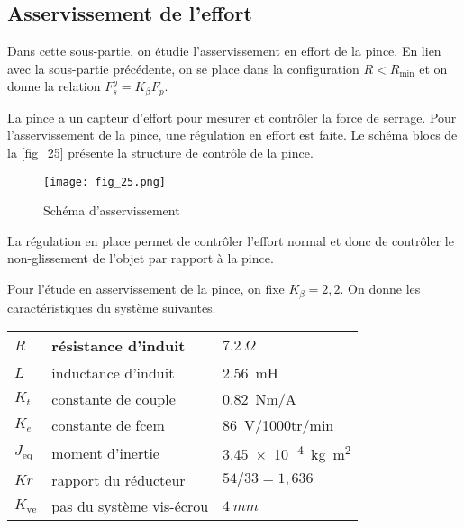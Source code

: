 \subsection{Asservissement de l'effort}

\begin{obj}
Dans cette sous-partie, on étudie l’asservissement en effort de la pince. En lien avec la
sous-partie précédente, on se place dans la configuration $R < R_{\text{min}}$ et on donne la relation
$F_s^y = K_{\beta} F_p$.
\end{obj}

\ifprof
\else
La pince a un capteur d'effort pour mesurer et contrôler la force de serrage. Pour l'asservissement
de la pince, une régulation en effort est faite. Le schéma blocs de la \autoref{fig_25} présente la structure
de contrôle de la pince.


\begin{figure}[H]
\centering
\texttt{[image: fig\_25.png]}
\caption{Schéma d'asservissement \label{fig_25}}
\end{figure}

\fi

\ifprof
\begin{corrige}
La régulation en place permet de contrôler l’effort normal et donc de contrôler le non-glissement de l’objet par rapport à la pince.
\end{corrige}
\else
\fi
Pour l’étude en asservissement de la pince, on fixe $K_{\beta} = 2,2$.
On donne les caractéristiques du système suivantes.

\ifprof
\else
\begin{table}[H]
\centering
\begin{tabular}{lll}
\hline
$R$ &  résistance d'induit 		& $\SI{7,2}{\Omega}$ \\ \hline
$L$ &   inductance d'induit 	& \SI{2,56}{mH} \\ \hline
$K_t$ &  constante de couple 	& \SI{0,82}{Nm/A} \\ \hline
$K_e$ &  constante de fcem 	& \SI{86}{V/1000tr/min} \\ \hline
$J_{\text{eq}}$ &  moment d'inertie 	& \SI{3,45e-4}{ kg m^2} \\ \hline
$Kr$ &  rapport du réducteur 	& $54/33=1,636$ \\ \hline
$K_{\text{ve}}$ & pas du système vis-écrou & $\SI{4}{mm}$  \\ \hline
\end{tabular}
\end{table}
\fi


